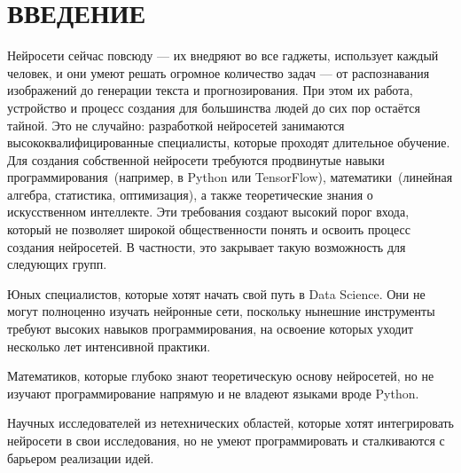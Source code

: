\documentclass{report}
\begin{document}

\setcounter{page}{2} %
\tableofcontents  %

\setcounter{chapter}{0} %
\setcounter{section}{0} %
\setcounter{subsection}{0} %
\setcounter{equation}{0} %


\chapter*{ВВЕДЕНИЕ} 

Нейросети сейчас повсюду --- их внедряют во все гаджеты, использует каждый человек, и они умеют решать огромное количество задач — от распознавания изображений до генерации текста и прогнозирования. При этом их работа, устройство и процесс создания для большинства людей до сих пор остаётся тайной. Это не случайно: разработкой нейросетей занимаются высококвалифицированные специалисты, которые проходят длительное обучение. Для создания собственной нейросети требуются продвинутые навыки программирования~(например, в Python или TensorFlow), математики~(линейная алгебра, статистика, оптимизация), а также теоретические знания о искусственном интеллекте. Эти требования создают высокий порог входа, который не позволяет широкой общественности понять и освоить процесс создания нейросетей. В частности, это закрывает такую возможность для следующих групп.

\begin{enumarabic}
\item Юных специалистов, которые хотят начать свой путь в Data Science. Они не могут полноценно изучать нейронные сети, поскольку нынешние инструменты требуют высоких навыков программирования, на освоение которых уходит несколько лет интенсивной практики.
\item Математиков, которые глубоко знают теоретическую основу нейросетей, но не изучают программирование напрямую и не владеют языками вроде Python.
\item Научных исследователей из нетехнических областей, которые хотят интегрировать нейросети в свои исследования, но не умеют программировать и сталкиваются с барьером реализации идей.
\end{enumarabic}
\end{document}
